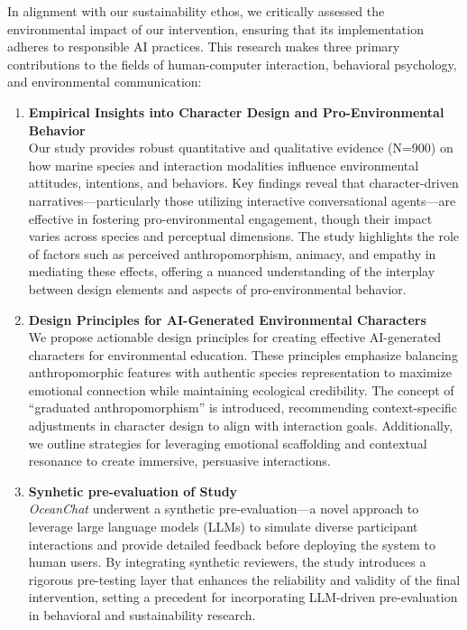 \documentclass[sigconf, nonacm]{acmart}
\begin{document}
In alignment with our sustainability ethos, we critically assessed the environmental impact of our intervention, ensuring that its implementation adheres to responsible AI practices. This research makes three primary contributions to the fields of human-computer interaction, behavioral psychology, and environmental communication:
\begin{enumerate}
    \item \textbf{Empirical Insights into Character Design and Pro-Environmental Behavior} \\
    Our study provides robust quantitative and qualitative evidence (N=900) on how marine species and interaction modalities influence environmental attitudes, intentions, and behaviors. Key findings reveal that character-driven narratives—particularly those utilizing interactive conversational agents—are effective in fostering pro-environmental engagement, though their impact varies across species and perceptual dimensions. The study highlights the role of factors such as perceived anthropomorphism, animacy, and empathy in mediating these effects, offering a nuanced understanding of the interplay between design elements and aspects of pro-environmental behavior.
    \item \textbf{Design Principles for AI-Generated Environmental Characters} \\
    We propose actionable design principles for creating effective AI-generated characters for environmental education. These principles emphasize balancing anthropomorphic features with authentic species representation to maximize emotional connection while maintaining ecological credibility. The concept of “graduated anthropomorphism” is introduced, recommending context-specific adjustments in character design to align with interaction goals. Additionally, we outline strategies for leveraging emotional scaffolding and contextual resonance to create immersive, persuasive interactions.
    \item \textbf{Synhetic pre-evaluation of Study} \\
    \textit{OceanChat} underwent a synthetic pre-evaluation—a novel approach to leverage large language models (LLMs) to simulate diverse participant interactions and provide detailed feedback before deploying the system to human users. By integrating synthetic reviewers, the study introduces a rigorous pre-testing layer that enhances the reliability and validity of the final intervention, setting a precedent for incorporating LLM-driven pre-evaluation in behavioral and sustainability research.
\end{enumerate}
\end{document}
